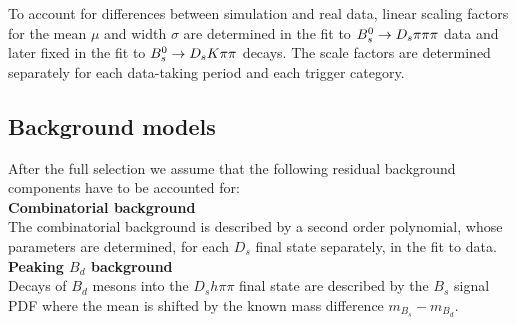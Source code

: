 To account for differences between simulation and real data, linear scaling factors for the mean $\mu$ and width $\sigma$ are determined in the fit to ${{B}^0_{s}}\rightarrow{\ensuremath{{D}_{s}}}{\ensuremath{\pi}}{\ensuremath{\pi}}{\ensuremath{\pi}}$ data  
and later fixed in the fit to ${{B}^0_{s}}\rightarrow{\ensuremath{{D}_{s}}}{\ensuremath{K}}{\ensuremath{\pi}}{\ensuremath{\pi}}$ decays. 
The scale factors are determined separately for each data-taking period and each trigger category.



\subsection{Background models} 
\label{subsec:bkgModel}

After the full selection we assume that the following residual background components have to be accounted for: \\
%
%
%
%
%
%

\noindent \textbf{Combinatorial background}  \\
The combinatorial background is described by a second order polynomial,
whose parameters are determined, for each $D_s$ final state separately, in the fit to data.
\\

\noindent\textbf{Peaking $B_d$ background}  \\
Decays of $B_d$ mesons into the $D_s h \pi \pi$ final state are described by the $B_s$ signal PDF where the mean is shifted by the known mass difference $m_{B_s} - m_{B_d}$\cite{Agashe:2014kda}.
\\

